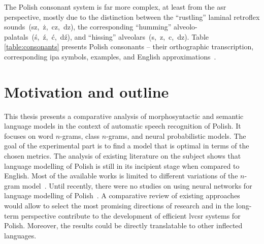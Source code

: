 The Polish consonant system is far more complex, at least from the \gls{asr} perspective, mostly due to the distinction between the \enquote{rustling} laminal retroflex sounds~(sz,~ż,~cz,~dz), the corresponding \enquote{humming} alveolo-palatals~(ś,~ź,~ć,~dź), and \enquote{hissing} alveolars~(s,~z,~c,~dz). Table \ref{table:consonants} presents Polish consonants -- their orthographic transcription, corresponding \gls{ipa} symbols, examples, and English approximations~\cite{gussmann2007phonology}. 

\section{Motivation and outline}
\label{section:outline}
This thesis presents a comparative analysis of morphosyntactic and semantic language models in the context of automatic speech recognition of Polish. It focuses on word \mbox{$n$-grams}, class \mbox{$n$-grams}, and neural probabilistic models. The goal of the experimental part is to find a model that is optimal in terms of the chosen metrics. The analysis of existing literature on the subject shows that language modelling of Polish is still in its incipient stage when compared to English. Most of the available works is limited to different variations of the \mbox{$n$-gram} model~\mbox{\cite{majewski2008syllable, ziolko2011n}}. Until recently, there were no studies on using neural networks for language modelling of Polish~\mbox{\cite{gajecki2013modelowanie, brocki2012connectionist}}. A comparative review of existing approaches would allow to select the most promising directions of research and in the long-term perspective contribute to the development of efficient \gls{lvcsr} systems for Polish. Moreover, the results could be directly translatable to other inflected languages.

